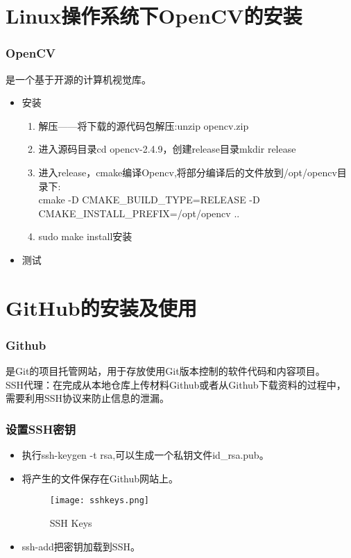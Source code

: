 \documentclass[notheorems,mathserif,table,compress]{beamer}  %
\begin{document}
\section{Linux操作系统下OpenCV的安装}

\begin{frame}
\frametitle{OpenCV}
是一个基于开源的计算机视觉库。\\
\begin{itemize}
\item 安装\\
	\begin{enumerate}
	\item 解压——将下载的源代码包解压:unzip opencv.zip\\
	\item 进入源码目录cd opencv-2.4.9，创建release目录mkdir release\\
	\item 进入release，cmake编译Opencv,将部分编译后的文件放到/opt/opencv目录下:\\
cmake -D CMAKE\_BUILD\_TYPE=RELEASE -D CMAKE\_INSTALL\_PREFIX=/opt/opencv ..  \\
	\item sudo make install安装\\
	\end{enumerate}
\item 测试
\end{itemize}
\end{frame}

\section{GitHub的安装及使用}

\begin{frame}
\frametitle{Github}
是Git的项目托管网站，用于存放使用Git版本控制的软件代码和内容项目。\\
SSH代理：在完成从本地仓库上传材料Github或者从Github下载资料的过程中，需要利用SSH协议来防止信息的泄漏。\\
\end{frame}


\begin{frame}
\frametitle{设置SSH密钥}
\begin{itemize}
\item 执行ssh-keygen -t rsa,可以生成一个私钥文件id\_rsa.pub。
\item 将产生的文件保存在Github网站上。
	\begin{figure}
	\centering
	\texttt{[image: sshkeys.png]}
	\caption{SSH Keys}
	\end{figure} 
\item ssh-add把密钥加载到SSH。
\end{itemize}
\end{frame}
\end{document}
